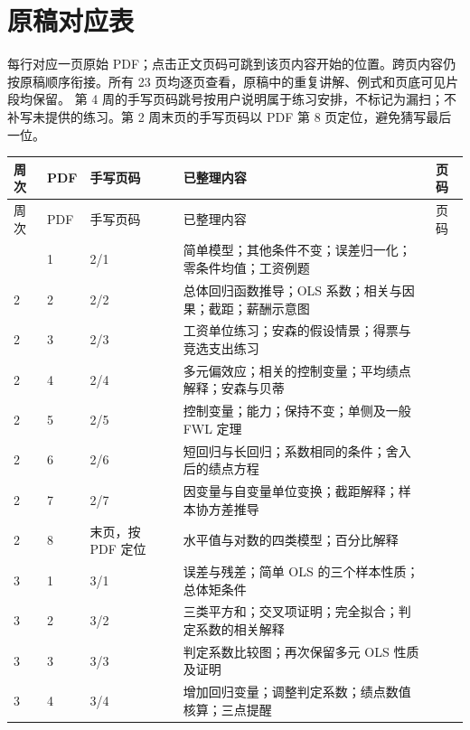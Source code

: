 \chapter{原稿对应表}
\label{app:sources}
每行对应一页原始 PDF；点击正文页码可跳到该页内容开始的位置。跨页内容仍按原稿顺序衔接。所有 23 页均逐页查看，原稿中的重复讲解、例式和页底可见片段均保留。
第 4 周的手写页码跳号按用户说明属于练习安排，不标记为漏扫；不补写未提供的练习。第 2 周末页的手写页码以 PDF 第 8 页定位，避免猜写最后一位。
\small\renewcommand{\arraystretch}{1.25}
\begin{longtable}{P{1.05cm}P{.8cm}P{2.25cm}P{9.7cm}P{.9cm}}
\toprule 周次 & PDF & 手写页码 & 已整理内容 & 页码\\\midrule\endfirsthead
\toprule 周次 & PDF & 手写页码 & 已整理内容 & 页码\\\midrule\endhead
\bottomrule{} & 1 & 2/1 & 简单模型；其他条件不变；误差归一化；零条件均值；工资例题 & \hyperref[src:w2p1]{\pageref*{src:w2p1}}\\
2 & 2 & 2/2 & 总体回归函数推导；OLS 系数；相关与因果；截距；薪酬示意图 & \hyperref[src:w2p2]{\pageref*{src:w2p2}}\\
2 & 3 & 2/3 & 工资单位练习；安森的假设情景；得票与竞选支出练习 & \hyperref[src:w2p3]{\pageref*{src:w2p3}}\\
2 & 4 & 2/4 & 多元偏效应；相关的控制变量；平均绩点解释；安森与贝蒂 & \hyperref[src:w2p4]{\pageref*{src:w2p4}}\\
2 & 5 & 2/5 & 控制变量；能力；保持不变；单侧及一般 FWL 定理 & \hyperref[src:w2p5]{\pageref*{src:w2p5}}\\
2 & 6 & 2/6 & 短回归与长回归；系数相同的条件；舍入后的绩点方程 & \hyperref[src:w2p6]{\pageref*{src:w2p6}}\\
2 & 7 & 2/7 & 因变量与自变量单位变换；截距解释；样本协方差推导 & \hyperref[src:w2p7]{\pageref*{src:w2p7}}\\
2 & 8 & 末页，按 PDF 定位 & 水平值与对数的四类模型；百分比解释 & \hyperref[src:w2p8]{\pageref*{src:w2p8}}\\
3 & 1 & 3/1 & 误差与残差；简单 OLS 的三个样本性质；总体矩条件 & \hyperref[src:w3p1]{\pageref*{src:w3p1}}\\
3 & 2 & 3/2 & 三类平方和；交叉项证明；完全拟合；判定系数的相关解释 & \hyperref[src:w3p2]{\pageref*{src:w3p2}}\\
3 & 3 & 3/3 & 判定系数比较图；再次保留多元 OLS 性质及证明 & \hyperref[src:w3p3]{\pageref*{src:w3p3}}\\
3 & 4 & 3/4 & 增加回归变量；调整判定系数；绩点数值核算；三点提醒 & \hyperref[src:w3p4]{\pageref*{src:w3p4}}\\

\end{longtable}
